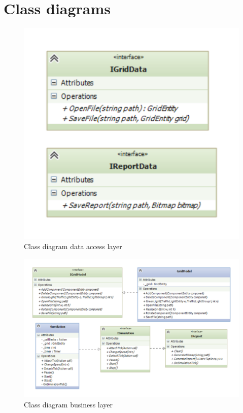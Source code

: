 \section{Class diagrams}
\newpage
\begin{figure}[!ht]
	\centering
	\includegraphics{figures/DataLayer}
	\caption{Class diagram data access layer}
	\label{fig:data}
\end{figure}



\begin{landscape}
	\begin{figure}[!ht]
		\centering
		\includegraphics[height=\textheight]{figures/BusinessLayer}
		\caption{Class diagram business layer}
		\label{fig:bus}
	\end{figure}
\end{landscape}

